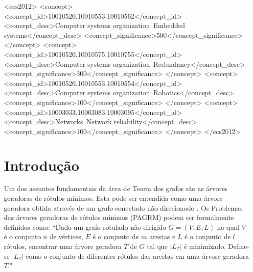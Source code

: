 \documentclass{sig-alternate-05-2015}
\begin{document}
%
%
\begin{CCSXML}
<ccs2012>
 <concept>
  <concept_id>10010520.10010553.10010562</concept_id>
  <concept_desc>Computer systems organization~Embedded systems</concept_desc>
  <concept_significance>500</concept_significance>
 </concept>
 <concept>
  <concept_id>10010520.10010575.10010755</concept_id>
  <concept_desc>Computer systems organization~Redundancy</concept_desc>
  <concept_significance>300</concept_significance>
 </concept>
 <concept>
  <concept_id>10010520.10010553.10010554</concept_id>
  <concept_desc>Computer systems organization~Robotics</concept_desc>
  <concept_significance>100</concept_significance>
 </concept>
 <concept>
  <concept_id>10003033.10003083.10003095</concept_id>
  <concept_desc>Networks~Network reliability</concept_desc>
  <concept_significance>100</concept_significance>
 </concept>
</ccs2012>  
\end{CCSXML}



%
%

%
%
\printccsdesc



\section{Introdução}

Um dos assuntos fundamentais da área de Teoria dos grafos são as árvores geradoras de rótulos mínimos. Esta pode ser entendida como uma árvore geradora obtida através de um grafo conectado não direcionado \cite{}. Os Problemas das árvores geradoras de rótulos mínimos (PAGRM)  podem ser formalmente definidos como: ``Dado um grafo rotulado não dirigido $G = (V,E,L) $ no qual $ V $ é o conjunto $ n$ de vértices, $E$ é o conjunto de $m$ arestas e $L$ é o conjunto de $l$ rótulos, encontrar uma árvore geradora $T$ de $G$ tal que $|L_{T}|$ é minimizado. Define-se  $|L_{T}|$ como o conjunto de diferentes rótulos das arestas em uma árvore geradora $T$."
\end{document}
